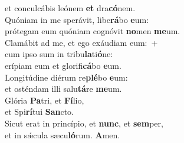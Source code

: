 \oddverse et conculcábis leónem \textbf{et} dra\textbf{có}nem.\\
\evenverse Quóniam in me sperávit, libe\textbf{rá}bo \textbf{e}um:~\*\\
\evenverse prótegam eum quóniam cognóvit \textbf{no}men \textbf{me}um.\\
\oddverse Clamábit ad me, et ego exáudiam eum:~+\\
\oddverse  cum ipso sum in tribu\textbf{la}ti\textbf{ó}ne:~\*\\
\oddverse erípiam eum et glorifi\textbf{cá}bo \textbf{e}um.\\
\evenverse Longitúdine diérum re\textbf{plé}bo \textbf{e}um:~\*\\
\evenverse et osténdam illi salu\textbf{tá}re \textbf{me}um.\\
\oddverse Glória \textbf{Pa}tri, et \textbf{Fí}lio,~\*\\
\oddverse et Spi\textbf{rí}tui \textbf{San}cto.\\
\evenverse Sicut erat in princípio, et \textbf{nunc}, et \textbf{sem}per,~\*\\
\evenverse et in sǽcula sæcu\textbf{ló}rum. \textbf{A}men.\\
